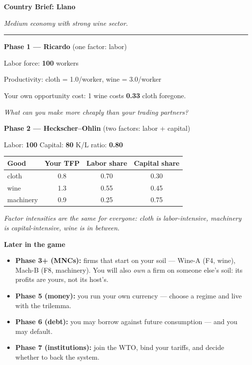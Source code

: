 \documentclass[11pt]{article}
\newcommand{\hr}{\par\vspace{2pt}\noindent\rule{\linewidth}{0.4pt}\par\vspace{2pt}}
\begin{document}
\newpage

{\Large\bfseries Country Brief: Llano}\par
\textit{Medium economy with strong wine sector.}
\hr

{\bfseries Phase 1 --- Ricardo} \hfill (one factor: labor)\par
Labor force: \textbf{100} workers\par
Productivity: cloth = 1.0/worker, wine = 3.0/worker\par
Your own opportunity cost: 1 wine costs \textbf{0.33} cloth foregone.\par
\textit{What can you make more cheaply than your trading partners?}

\vspace{6pt}
{\bfseries Phase 2 --- Heckscher--Ohlin} \hfill (two factors: labor + capital)\par
Labor: \textbf{100} \quad Capital: \textbf{80} \quad K/L ratio: \textbf{0.80}\par
\vspace{2pt}
\begin{tabular}{lccc}
\toprule
Good & Your TFP & Labor share & Capital share \\
\midrule
    cloth & 0.8 & 0.70 & 0.30 \\
    wine & 1.3 & 0.55 & 0.45 \\
    machinery & 0.9 & 0.25 & 0.75 \\
\bottomrule
\end{tabular}\par
\vspace{2pt}
\textit{Factor intensities are the same for everyone: cloth is labor-intensive,
machinery is capital-intensive, wine is in between.}

\vspace{6pt}
{\bfseries Later in the game}\par
\begin{itemize}[nosep,leftmargin=1.4em]
  \item \textbf{Phase 3+ (MNCs):} firms that start on your soil --- Wine-A (F4, wine), Mach-B (F8, machinery).
    You will also \emph{own} a firm on someone else's soil: its profits are
    yours, not its host's.
  \item \textbf{Phase 5 (money):} you run your own currency --- choose a regime and live with the trilemma.
  \item \textbf{Phase 6 (debt):} you may borrow against future consumption --- and you may default.
  \item \textbf{Phase 7 (institutions):} join the WTO, bind your tariffs, and decide whether to back the system.
\end{itemize}
\end{document}
